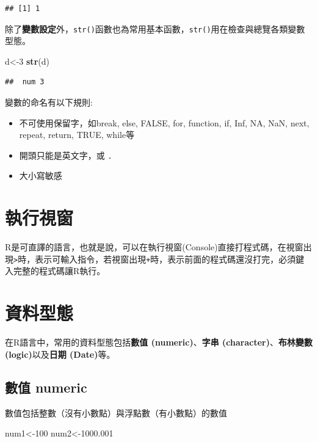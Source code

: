 \documentclass[]{book}
\newenvironment{Shaded}{\begin{snugshade}}{\end{snugshade}}
\newcommand{\KeywordTok}[1]{\textcolor[rgb]{0.13,0.29,0.53}{\textbf{{#1}}}}
\newcommand{\DecValTok}[1]{\textcolor[rgb]{0.00,0.00,0.81}{{#1}}}
\newcommand{\FloatTok}[1]{\textcolor[rgb]{0.00,0.00,0.81}{{#1}}}
\newcommand{\NormalTok}[1]{{#1}}
\providecommand{\tightlist}{%
  \setlength{\itemsep}{0pt}\setlength{\parskip}{0pt}}
\theoremstyle{definition}
\theoremstyle{definition}
\theoremstyle{remark}
\begin{document}
\begin{verbatim}
## [1] 1
\end{verbatim}

除了\textbf{變數設定}外，\texttt{str()}函數也為常用基本函數，\texttt{str()}用在檢查與總覽各類變數型態。

\begin{Shaded}
\begin{Highlighting}[]
\NormalTok{d<-}\DecValTok{3}
\KeywordTok{str}\NormalTok{(d)}
\end{Highlighting}
\end{Shaded}

\begin{verbatim}
##  num 3
\end{verbatim}

變數的命名有以下規則:

\begin{itemize}
\tightlist
\item
  不可使用保留字，如break, else, FALSE, for, function, if, Inf, NA, NaN,
  next, repeat, return, TRUE, while等
\item
  開頭只能是英文字，或 \texttt{.}
\item
  大小寫敏感
\end{itemize}

\section{執行視窗}

R是可直譯的語言，也就是說，可以在執行視窗(Console)直接打程式碼，在視窗出現\texttt{\textgreater{}}時，表示可輸入指令，若視窗出現\texttt{+}時，表示前面的程式碼還沒打完，必須鍵入完整的程式碼讓R執行。

\section{資料型態}\label{DataType}

在R語言中，常用的資料型態包括\textbf{數值 (numeric)}、\textbf{字串
(character)}、\textbf{布林變數 (logic)}以及\textbf{日期 (Date)}等。

\subsection{數值 numeric}\label{-numeric}

數值包括整數（沒有小數點）與浮點數（有小數點）的數值

\begin{Shaded}
\begin{Highlighting}[]
\NormalTok{num1<-}\DecValTok{100} 
\NormalTok{num2<-}\FloatTok{1000.001}
\end{Highlighting}
\end{Shaded}
\end{document}
